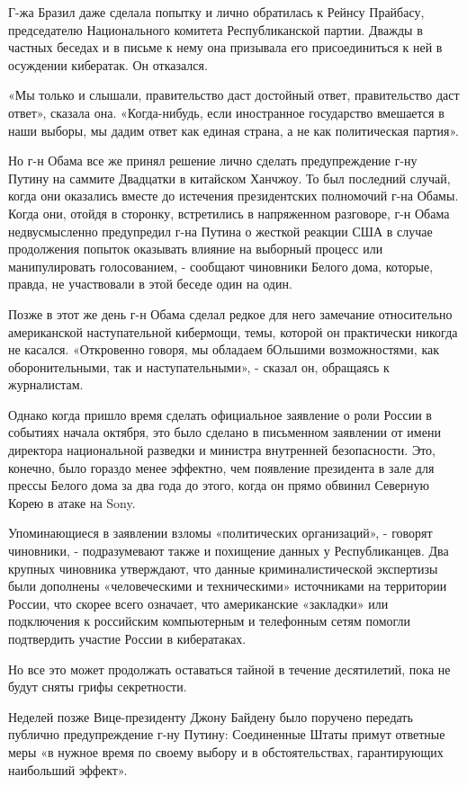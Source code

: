 Г-жа Бразил даже сделала попытку и лично обратилась к Рейнсу Прайбасу,
председателю Национального комитета Республиканской партии. Дважды в
частных беседах и в письме к нему она призывала его присоединиться к ней
в осуждении кибератак. Он отказался.

«Мы только и слышали, правительство даст достойный ответ, правительство
даст ответ», сказала она. «Когда-нибудь, если иностранное государство
вмешается в наши выборы, мы дадим ответ как единая страна, а не как
политическая партия».

Но г-н Обама все же принял решение лично сделать предупреждение г-ну
Путину на саммите Двадцатки в китайском Ханчжоу. То был последний
случай, когда они оказались вместе до истечения президентских полномочий
г-на Обамы. Когда они, отойдя в сторонку, встретились в напряженном
разговоре, г-н Обама недвусмысленно предупредил г-на Путина о жесткой
реакции США в случае продолжения попыток оказывать влияние на выборный
процесс или манипулировать голосованием, - сообщают чиновники Белого
дома, которые, правда, не участвовали в этой беседе один на один.

Позже в этот же день г-н Обама сделал редкое для него замечание
относительно американской наступательной кибермощи, темы, которой он
практически никогда не касался. «Откровенно говоря, мы обладаем бОльшими
возможностями, как оборонительными, так и наступательными», - сказал он,
обращаясь к журналистам.

Однако когда пришло время сделать официальное заявление о роли России в
событиях начала октября, это было сделано в письменном заявлении от
имени директора национальной разведки и министра внутренней
безопасности. Это, конечно, было гораздо менее эффектно, чем появление
президента в зале для прессы Белого дома за два года до этого, когда он
прямо обвинил Северную Корею в атаке на Sony.

Упоминающиеся в заявлении взломы «политических организаций», - говорят
чиновники, - подразумевают также и похищение данных у Республиканцев.
Два крупных чиновника утверждают, что данные криминалистической
экспертизы были дополнены «человеческими и техническими» источниками на
территории России, что скорее всего означает, что американские
«закладки» или подключения к российским компьютерным и телефонным сетям
помогли подтвердить участие России в кибератаках.

Но все это может продолжать оставаться тайной в течение десятилетий,
пока не будут сняты грифы секретности.

Неделей позже Вице-президенту Джону Байдену было поручено передать
публично предупреждение г-ну Путину: Соединенные Штаты примут ответные
меры «в нужное время по своему выбору и в обстоятельствах, гарантирующих
наибольший эффект».


